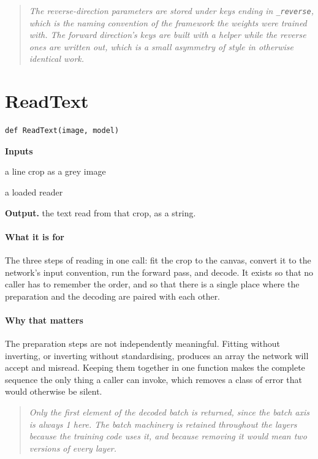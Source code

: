 \begin{quote}\small\itshape The reverse-direction parameters are stored under keys ending in \texttt{\_reverse}, which is the naming convention of the framework the weights were trained with. The forward direction's keys are built with a helper while the reverse ones are written out, which is a small asymmetry of style in otherwise identical work.\end{quote}

\section{ReadText}
\begin{lstlisting}[style=sig]
def ReadText(image, model)
\end{lstlisting}

\noindent\textbf{Inputs}
\begin{description}[leftmargin=2.2em,style=nextline,font=\normalfont\ttfamily]\setlength\itemsep{1pt}
  \item[{image}] \normalfont a line crop as a grey image
  \item[{model}] \normalfont a loaded reader
\end{description}

\noindent\textbf{Output.} the text read from that crop, as a string.


\paragraph{What it is for}
The three steps of reading in one call: fit the crop to the canvas, convert it to the network's input convention, run the forward pass, and decode. It exists so that no caller has to remember the order, and so that there is a single place where the preparation and the decoding are paired with each other.


\paragraph{Why that matters}
The preparation steps are not independently meaningful. Fitting without inverting, or inverting without standardising, produces an array the network will accept and misread. Keeping them together in one function makes the complete sequence the only thing a caller can invoke, which removes a class of error that would otherwise be silent.


\begin{quote}\small\itshape Only the first element of the decoded batch is returned, since the batch axis is always 1 here. The batch machinery is retained throughout the layers because the training code uses it, and because removing it would mean two versions of every layer.\end{quote}

